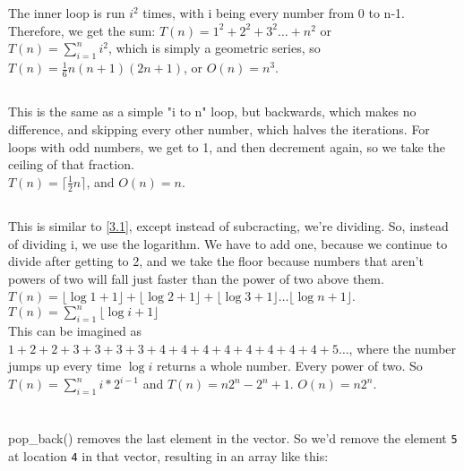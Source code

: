 \documentclass[12pt]{article}
\begin{document}
\section{}
\subsection{}
The inner loop is run \(i^2\) times, with i being every number from 0 to n-1. Therefore, we get the sum:
\(T(n)=1^2+2^2+3^2\dots+n^2\) or\\
\(T(n)=\displaystyle\sum_{i=1}^n i^2\), which is simply a geometric series, so \(T(n)=\frac{1}{6}n(n+1)(2n+1)\), or \(O(n)=n^3\).
\subsection{}
This is the same as a simple "i to n" loop, but backwards, which makes no difference, and skipping every other number, which halves the iterations. For loops with odd numbers, we get to 1, and then decrement again, so we take the ceiling of that fraction.\\
\(T(n)=\lceil\frac{1}{2}n\rceil\), and \(O(n)=n\).\\
\subsection{}
This is similar to \ref{3.1}, except instead of subcracting, we're dividing. So, instead of dividing i, we use the logarithm. We have to add one, because we continue to divide after getting to 2, and we take the floor because numbers that aren't powers of two will fall just faster than the power of two above them.\\
\(T(n)=\lfloor\log 1+1\rfloor+\lfloor\log 2+1\rfloor+\lfloor\log 3+1\rfloor\dots\lfloor\log n+1\rfloor\).\\
\(T(n)=\displaystyle\sum_{i=1}^n \lfloor\log i+1\rfloor\)\\
This can be imagined as \(1+2+2+3+3+3+3+4+4+4+4+4+4+4+4+5\dots\), where the number jumps up every time \(\log i\) returns a whole number. Every power of two. So \(T(n)=\displaystyle\sum_{i=1}^n i*2^{i-1}\) and \(T(n)=n2^n-2^n+1\). \(O(n)=n2^n\).\\

\section{}
pop\_back() removes the last element in the vector. So we'd remove the element \texttt{5} at location \texttt{4} in that vector, resulting in an array like this:
\end{document}
